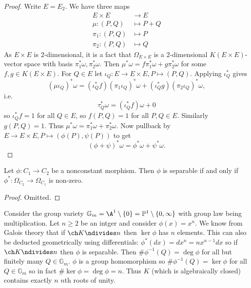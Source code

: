 \documentclass[a4paper]{article}
\theoremstyle{definition}
\renewcommand*{\P}{\mathbb{P}}
\begin{document}
\begin{proof}
  Write \(E = E_2\). We have three maps
  \begin{align*}
    E \times E &\to E \\
    \mu: (P, Q) &\mapsto P + Q \\
    \pi_1: (P, Q) &\mapsto P \\
    \pi_2: (P, Q) &\mapsto Q
  \end{align*}
  As \(E \times E\) is \(2\)-dimensional, it is a fact that \(\Omega_{E \times E}\) is a \(2\)-dimensional \(K(E \times E)\)-vector space with basis \(\pi_1^* \omega, \pi_2^* \omega\). Then \(\mu^* \omega = f \pi_1^* \omega + g \pi_2^* \omega\) for some \(f, g \in K(E \times E)\). For \(Q \in E\) let \(\iota_Q: E \to E \times E, P \mapsto (P, Q)\). Applying \(\iota_Q^*\) gives
  \[
    (\mu \iota_Q)^* \omega = (\iota_Q^* f) (\pi_1 \iota_Q)^* \omega + (\iota_Q^* g) (\pi_2 \iota_Q)^* \omega,
  \]
  i.e.
  \[
    \tau_Q^* \omega = (\iota_Q^* f) \omega + 0
  \]
  so \(\iota_Q^*f = 1\) for all \(Q \in E\), so \(f(P, Q) = 1\) for all \(P, Q \in E\). Similarly \(g(P, Q) = 1\). Thus \(\mu^*\omega = \pi_1^* \omega + \pi_2^* \omega\). Now pullback by \(E \to E \times E, P \mapsto (\phi(P), \psi(P))\) to get
  \[
    (\phi + \psi)^*\omega = \phi^*\omega + \psi^*\omega.
  \]
\end{proof}

\begin{lemma}
  Let \(\phi: C_1 \to C_2\) be a nonconstant morphism. Then \(\phi\) is separable if and only if \(\phi^*: \Omega_{C_2} \to \Omega_{C_1}\) is non-zero.
\end{lemma}

\begin{proof}
  Omitted.
\end{proof}

\begin{eg}
  Consider the group variety \(\mathbb G_m = \A^1 \setminus \{0\} = \P^1 \setminus \{0, \infty\}\) with group law being multiplication. Let \(n \geq 2\) be an intger and consider \(\phi(x) = x^n\). We know from Galois theory that if \(\ch K \ndivides n\) then \(\ker \phi\) has \(n\) elements. This can also be deducted geometrically using differentials: \(\phi^* (dx) = dx^n = nx^{n - 1}dx\) so if \(\ch K \ndivides n\) then \(\phi\) is separable. Then \(\#\phi^{-1}(Q) = \deg \phi\) for all but finitely many \(Q \in \mathbb G_m\). \(\phi\) is a group homomorphism so \(\# \phi^{-1}(Q) = \ker \phi\) for all \(Q \in \mathbb G_m\) so in fact \(\# \ker \phi = \deg \phi= n\). Thus \(K\) (which is algebraically closed) contains exactly \(n\) \(n\)th roots of unity.
\end{eg}
\end{document}
